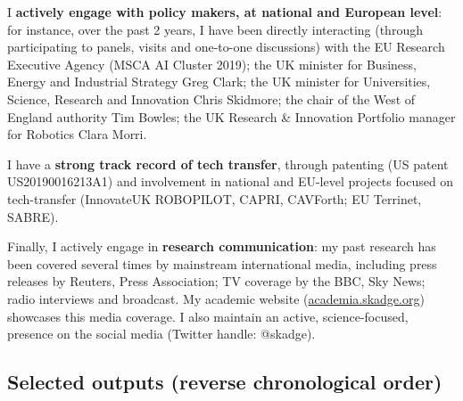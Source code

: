 \documentclass[11pt,a4paper]{report}
\begin{document}
\vspace{1em} 

I \textbf{actively engage with policy makers, at national and European
level}: for instance, over the past 2 years, I have been directly interacting
(through participating to panels, visits and one-to-one discussions) with the EU
Research Executive Agency (MSCA AI Cluster 2019); the UK minister for Business,
Energy and Industrial Strategy Greg Clark; the UK minister for Universities,
Science, Research and Innovation Chris Skidmore; the chair of the West of
England authority Tim Bowles; the UK Research \& Innovation Portfolio
manager for Robotics Clara Morri.

I have a \textbf{strong track record of tech transfer}, through patenting (US patent
US20190016213A1) and involvement in national and EU-level projects focused on
tech-transfer (InnovateUK ROBOPILOT, CAPRI, CAVForth; EU Terrinet, SABRE).

Finally, I actively engage in \textbf{research communication}: my past research has been
covered several times by mainstream international media, including press
releases by Reuters, Press Association; TV coverage by the BBC, Sky News; radio
interviews and broadcast. My academic website (\url{academia.skadge.org})
showcases this media coverage. I also maintain an active, science-focused,
presence on the social media (Twitter handle: @skadge).



\newpage
\subsection{Selected outputs (reverse chronological order)}
\end{document}
